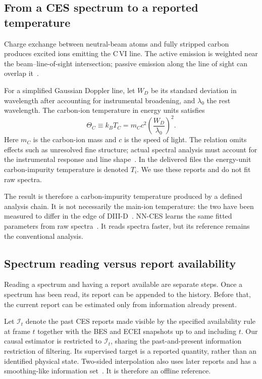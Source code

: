 \documentclass[11pt,a4paper]{article}
\begin{document}
\subsection{From a CES spectrum to a reported temperature}
Charge exchange between neutral-beam atoms and fully stripped carbon produces excited ions emitting the C\,VI line. The active emission is weighted near the beam--line-of-sight intersection; passive emission along the line of sight can overlap it~\citep{Fonck1984DeterminationPlasma,Isler1994OverviewCharge,Viezzer2011PassiveEdge}.

For a simplified Gaussian Doppler line, let $W_D$ be its standard deviation in wavelength after accounting for instrumental broadening, and $\lambda_0$ the rest wavelength. The carbon-ion temperature in energy units satisfies
\begin{equation}
 \Theta_C \equiv k_B T_C = m_C c^2\left(\frac{W_D}{\lambda_0}\right)^2 .
\end{equation}
Here $m_C$ is the carbon-ion mass and $c$ is the speed of light. The relation omits effects such as unresolved fine structure; actual spectral analysis must account for the instrumental response and line shape~\citep{Fonck1984DeterminationPlasma,Lee2026NeuralNetworkbased}. In the delivered files the energy-unit carbon-impurity temperature is denoted $T_i$. We use these reports and do not fit raw spectra.

The result is therefore a carbon-impurity temperature produced by a defined analysis chain. It is not necessarily the main-ion temperature: the two have been measured to differ in the edge of DIII-D~\citep{Haskey2018MainIon}. NN-CES learns the same fitted parameters from raw spectra~\citep{Lee2026NeuralNetworkbased}. It reads spectra faster, but its reference remains the conventional analysis.

\subsection{Spectrum reading versus report availability}
Reading a spectrum and having a report available are separate steps. Once a spectrum has been read, its report can be appended to the history. Before that, the current report can be estimated only from information already present.

Let $\mathcal{I}_t$ denote the past CES reports made visible by the specified availability rule at frame $t$ together with the BES and ECEI snapshots up to and including $t$. Our causal estimator is restricted to $\mathcal{I}_t$, sharing the past-and-present information restriction of filtering. Its supervised target is a reported quantity, rather than an identified physical state. Two-sided interpolation also uses later reports and has a smoothing-like information set~\citep{Shukla2020SurveyPrinciples,VanMulders2025ModelBased}. It is therefore an offline reference.
\end{document}
